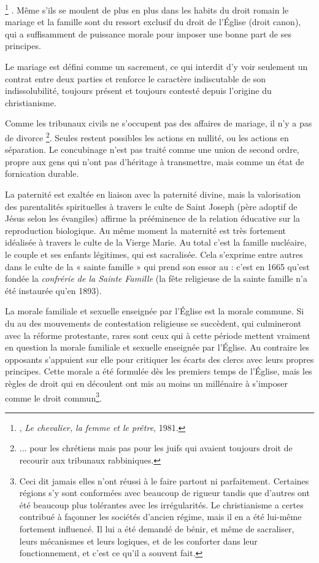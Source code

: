 \footnote{, \emph{Le chevalier, la femme et le prêtre}, 1981.}%
. Même s'ils se moulent de plus en plus dans les habits du droit romain le mariage et la famille sont du ressort exclusif du droit de l'Église (droit canon), qui a suffisamment de puissance morale pour imposer une bonne part de ses principes. 

Le mariage est défini comme un sacrement, ce qui interdit d'y voir seulement un contrat entre deux parties et renforce le caractère indiscutable de son indissolubilité, toujours présent et toujours contesté depuis l'origine du christianisme. 

 

 Comme les tribunaux civils ne s'occupent pas des affaires de mariage, il n'y a pas de divorce \footnote{... pour les chrétiens mais pas pour les juifs qui avaient toujours droit de recourir aux tribunaux rabbiniques.}. 
Seules restent possibles les actions en nullité, ou les actions en séparation. Le concubinage n'est pas traité comme une union de second ordre, propre aux gens qui n'ont pas d'héritage à transmettre, mais comme un état de fornication durable.



 La paternité est exaltée en liaison avec la paternité divine, mais la valorisation des parentalités spirituelles à travers le culte de Saint Joseph (père adoptif de Jésus selon les évangiles) affirme la prééminence de la relation éducative sur la reproduction biologique. Au même moment la maternité est très fortement idéalisée à travers le culte de la Vierge Marie. Au total c'est la famille nucléaire, le couple et ses enfants légitimes, qui est sacralisée. Cela s'exprime entre autres dans le culte de la « sainte famille » qui prend son essor au  : c'est en 1665 qu'est fondée la \emph{confrérie de la Sainte Famille} (la fête religieuse de la sainte famille n'a été instaurée qu'en 1893). 
 
 La morale familiale et sexuelle enseignée par l'Église est la morale commune. Si du  au  des mouvements de contestation religieuse se succèdent, qui culmineront avec la réforme protestante, rares sont ceux qui à cette période mettent vraiment en question la morale familiale et sexuelle enseignée par l'Église. Au contraire les opposants s'appuient sur elle pour critiquer les écarts des clercs avec leurs propres principes. Cette morale a été formulée dès les premiers temps de l'Église, mais les règles de droit qui en découlent ont mis au moins un millénaire à s'imposer comme le droit commun\footnote{Ceci dit jamais elles n'ont réussi à le faire partout ni parfaitement. Certaines régions s'y sont conformées avec beaucoup de rigueur tandis que d'autres ont été beaucoup plus tolérantes avec les irrégularités.  Le christianisme a certes contribué à façonner les sociétés d'ancien régime, mais il en a été lui-même fortement influencé. Il lui a été demandé de bénir, et même de sacraliser, leurs mécanismes et leurs logiques, et de les conforter dans leur fonctionnement, et c'est ce qu'il a souvent fait.}. 
 
